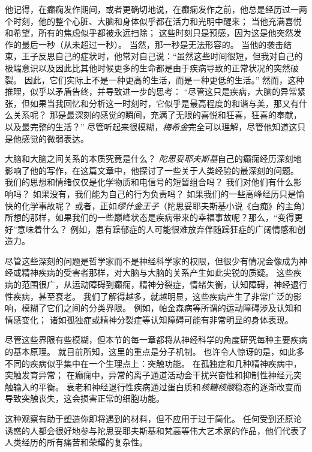 他记得，在癫痫发作期间，或者更确切地说，在癫痫发作之前，他总是经历过一两个时刻，他的整个心脏、大脑和身体似乎都在活力和光明中醒来；
当他充满喜悦和希望，所有的焦虑似乎都被永远扫除；
这些时刻只是预感，因为这是他突然发作的最后一秒（从未超过一秒）。
当然，那一秒是无法形容的。
当他的袭击结束，王子反思自己的症状时，他常对自己说：“虽然这些时间很短，但我对自己的极端意识以及因此比其他时候更多的生命都是由于疾病导致的正常状况的突然破裂。
因此，它们实际上不是一种更高的生活，而是一种更低的生活。”
然而，这种推理，似乎以矛盾告终，并导致进一步的思考：
“尽管这只是疾病，大脑的异常紧张，但如果当我回忆和分析这一时刻时，它似乎是最高程度的和谐与美，那又有什么关系呢？
那是最深刻的感觉的瞬间，充满了无限的喜悦和狂喜，狂喜的奉献，以及最完整的生活？”
尽管听起来很模糊，\textit{梅希金}完全可以理解，尽管他知道这只是他感觉的微弱表达。


大脑和大脑之间关系的本质究竟是什么？
\textit{陀思妥耶夫斯基}自己的癫痫经历深刻地影响了他的写作，在这篇文章中，他探讨了一些关于人类经验的最深刻的问题。
我们的思想和情绪仅仅是化学物质和电信号的短暂组合吗？
我们对他们有什么影响吗？
如果没有，我们能为自己的行为负责吗？
如果我们的一些高峰经历只是愉快的化学事故呢？
或者，正如\textit{缪什金王子}（陀思妥耶夫斯基小说《白痴》的主角）所想的那样，如果我们的一些巅峰状态是疾病带来的幸福事故呢？那么，“变得更好”意味着什么？
例如，患有躁郁症的人可能很难放弃伴随躁狂症的广阔情感和创造力。


尽管这些深刻的问题是哲学家而不是神经科学家的权限，但很少有情况会像成为神经或精神疾病的受害者那样，对大脑与大脑的关系产生如此尖锐的质疑。
这些疾病的范围很广，从运动障碍到癫痫，精神分裂症，情绪失衡，认知障碍，神经退行性疾病，甚至衰老。
我们了解得越多，就越明显，这些疾病产生了非常广泛的影响，模糊了它们之间的分类界限。
例如，帕金森病等所谓的运动障碍涉及认知和情感变化；
诸如孤独症或精神分裂症等认知障碍可能有非常明显的身体表现。


尽管这些界限有些模糊，但本节的每一章都将从神经科学的角度研究每种主要疾病的基本原理。
就目前所知，这里的重点是分子机制。
也许令人惊讶的是，如此多不同的疾病似乎集中在一个生理点上：突触功能。
在孤独症和几种精神疾病中，突触发育异常；
在癫痫中，异常的离子通道活动会干扰兴奋性和抑制性神经元突触输入的平衡。
衰老和神经退行性疾病通过蛋白质和\textit{核糖核酸}稳态的逐渐改变而导致突触丧失，这会损害正常的细胞功能。


这种观察有助于塑造你即将遇到的材料，但不应用于过于简化。
任何受到还原论诱惑的人都会很好地参与陀思妥耶夫斯基和梵高等伟大艺术家的作品，他们代表了人类经历的所有痛苦和荣耀的复杂性。




